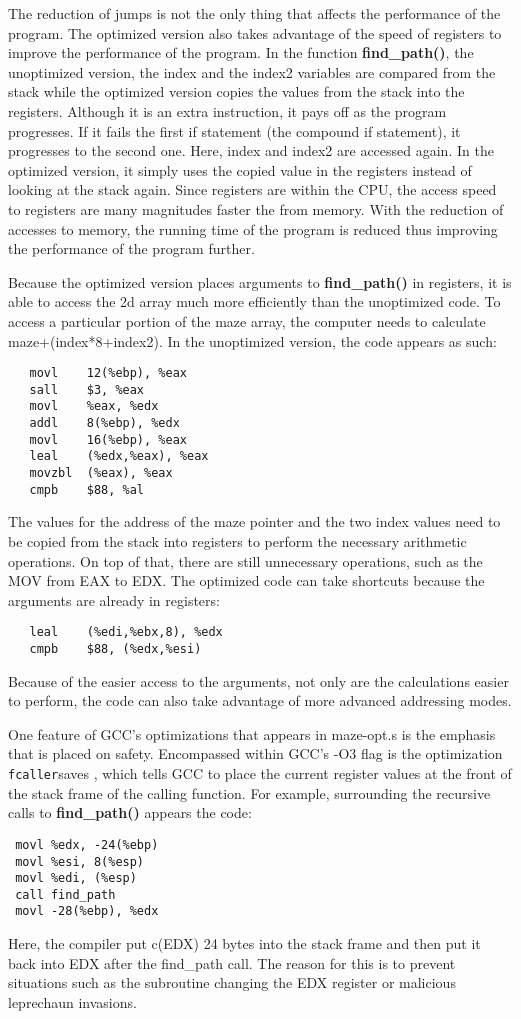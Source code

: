 \documentclass[12pt,letterpaper]{article}
\begin{document}
The reduction of jumps is not the only thing that affects the performance 
of the program.  The optimized version also takes advantage of the speed 
of registers to improve the performance of the program.  In the function 
{\bf find\_path()}, the unoptimized version, the index and the index2 
variables are compared from the stack while the optimized version copies 
the values from the stack into the registers.  Although it is an extra 
instruction, it pays off as the program progresses.  If it fails the first 
if statement (the compound if statement), it progresses to the second one.  
Here, index and index2 are accessed again.  In the optimized version, 
it simply uses the copied value in the registers instead of looking at 
the stack again.  Since registers are within the CPU, the access speed 
to registers are many magnitudes faster the from memory.  With the 
reduction of accesses to memory, the running time of the program 
is reduced thus improving the performance of the program further.

Because the optimized version places arguments to {\bf find\_path()} 
in registers, it is able to access the 2d array much more efficiently 
than the unoptimized code. To access a particular portion of the maze array, 
the computer needs to calculate maze+(index*8+index2). In the unoptimized 
version, the code appears as such:
\begin{verbatim}
   movl    12(%ebp), %eax
   sall    $3, %eax
   movl    %eax, %edx
   addl    8(%ebp), %edx
   movl    16(%ebp), %eax
   leal    (%edx,%eax), %eax
   movzbl  (%eax), %eax
   cmpb    $88, %al
\end{verbatim}
The values for the address of the maze pointer and the two index values 
need to be copied from the stack into registers to perform the necessary 
arithmetic operations. On top of that, there are still unnecessary 
operations, such as the MOV from EAX to EDX. The optimized code can 
take shortcuts because the arguments are already in registers:
\begin{verbatim}
   leal    (%edi,%ebx,8), %edx
   cmpb    $88, (%edx,%esi)
\end{verbatim}
Because of the easier access to the arguments, not only are the 
calculations easier to perform, the code can also take advantage 
of more advanced addressing modes.

One feature of GCC's optimizations that appears in maze-opt.s is the 
emphasis that is placed on safety. Encompassed within GCC's -O3 flag 
is the optimization \verb -fcaller-saves , which tells GCC to place 
the current register values at the front of the stack frame of the 
calling function. For example, surrounding the recursive calls 
to {\bf find\_path()} appears the code:
\begin{verbatim}
 movl %edx, -24(%ebp)
 movl %esi, 8(%esp)
 movl %edi, (%esp)
 call find_path
 movl -28(%ebp), %edx
\end{verbatim}
Here, the compiler put c(EDX) 24 bytes into the stack frame and then 
put it back into EDX after the find\_path call. The reason for this 
is to prevent situations such as the subroutine changing the EDX 
register or malicious leprechaun invasions.
\end{document}
